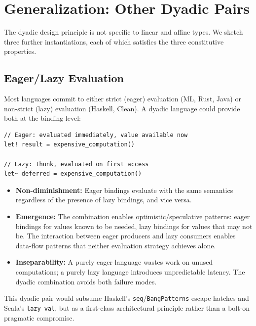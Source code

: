 \documentclass[11pt,a4paper]{article}
\begin{document}
\section{Generalization: Other Dyadic Pairs}
\label{sec:generalization}

The dyadic design principle is not specific to linear and affine types. We
sketch three further instantiations, each of which satisfies the three
constitutive properties.

\subsection{Eager/Lazy Evaluation}

Most languages commit to either strict (eager) evaluation (ML, Rust, Java) or
non-strict (lazy) evaluation (Haskell, Clean). A dyadic language could provide
both at the binding level:

\begin{lstlisting}[language=Ephapax, caption={Hypothetical eager/lazy dyadic bindings.}]
// Eager: evaluated immediately, value available now
let! result = expensive_computation()

// Lazy: thunk, evaluated on first access
let~ deferred = expensive_computation()
\end{lstlisting}

\begin{itemize}
  \item \textbf{Non-diminishment:} Eager bindings evaluate with the same
    semantics regardless of the presence of lazy bindings, and vice versa.
  \item \textbf{Emergence:} The combination enables optimistic/speculative
    patterns: eager bindings for values known to be needed, lazy bindings for
    values that may not be. The interaction between eager producers and lazy
    consumers enables data-flow patterns that neither evaluation strategy
    achieves alone.
  \item \textbf{Inseparability:} A purely eager language wastes work on unused
    computations; a purely lazy language introduces unpredictable latency. The
    dyadic combination avoids both failure modes.
\end{itemize}

This dyadic pair would subsume Haskell's \lstinline{seq}/\lstinline{BangPatterns}
escape hatches and Scala's \lstinline{lazy val}, but as a first-class
architectural principle rather than a bolt-on pragmatic compromise.
\end{document}
